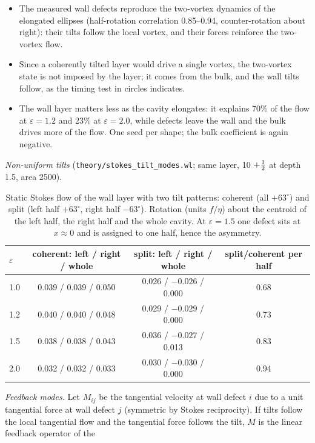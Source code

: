 \begin{itemize}
  \item The measured wall defects reproduce the two-vortex dynamics of the elongated ellipses (half-rotation correlation 0.85--0.94, counter-rotation about
        right): their tilts follow the local vortex, and their forces reinforce the two-vortex flow.
  \item Since a coherently tilted layer would drive a single vortex, the two-vortex state is not imposed by the layer; it comes from the bulk, and the
        wall tilts follow, as the timing test in circles indicates.
  \item The wall layer matters less as the cavity elongates: it explains 70\% of the flow at $\varepsilon=1.2$ and 23\% at $\varepsilon=2.0$, while
        defects leave the wall and the bulk drives more of the flow. One seed per shape; the bulk coefficient is again negative.
\end{itemize}
\noindent\emph{Non-uniform tilts} (\texttt{theory/stokes\_tilt\_modes.wl}; same layer, 10 $+\tfrac12$ at depth 1.5, area 2500).
\begin{table}[H]\centering\small
\caption{Static Stokes flow of the wall layer with two tilt patterns: coherent (all $+63^\circ$) and split (left half $+63^\circ$, right half $-63^\circ$).
Rotation (units $f/\eta$) about the centroid of the left half, the right half and the whole cavity. At $\varepsilon=1.5$ one defect sits at $x\approx0$ and is
assigned to one half, hence the asymmetry.}\label{tab:tiltsplit}
\begin{tabular}{lccc}\toprule
$\varepsilon$ & coherent: left / right / whole & split: left / right / whole & split/coherent per half\\\midrule
1.0 & 0.039 / 0.039 / 0.050 & 0.026 / $-0.026$ / 0.000 & 0.68\\
1.2 & 0.040 / 0.040 / 0.048 & 0.029 / $-0.029$ / 0.000 & 0.73\\
1.5 & 0.038 / 0.038 / 0.043 & 0.036 / $-0.027$ / 0.013 & 0.83\\
2.0 & 0.032 / 0.032 / 0.033 & 0.030 / $-0.030$ / 0.000 & 0.94\\\bottomrule
\end{tabular}
\end{table}
\noindent\emph{Feedback modes.} Let $M_{ij}$ be the tangential velocity at wall defect $i$ due to a unit tangential force at wall defect $j$ (symmetric by
Stokes reciprocity). If tilts follow the local tangential flow and the tangential force follows the tilt, $M$ is the linear feedback operator of the
